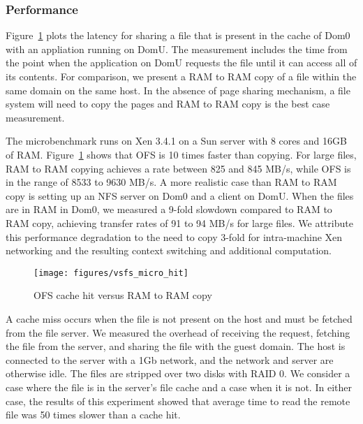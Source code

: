 \subsubsection{Performance}\label{sec:OFS_Perf}

Figure~\ref{fig:vsfs_hit} plots the latency for sharing a file that is
present in the cache of Dom0 with an appliation running on DomU. The
measurement includes the time from the point when the application on
DomU requests the file until it can access all of its contents.  For
comparison, we present a RAM to RAM copy of a file within the same
domain on the same host. In the absence of page sharing mechanism, a
file system will need to copy the pages and RAM to RAM copy is the
best case measurement.

The microbenchmark runs on Xen 3.4.1 on a Sun server with 8 cores and
16GB of RAM. Figure~\ref{fig:vsfs_hit} shows that OFS is 10 times
faster than copying. For large files, RAM to RAM copying achieves a
rate between 825 and 845 MB/s, while OFS is in the range of 8533 to
9630 MB/s. A more realistic case than RAM to RAM copy is setting up an
NFS server on Dom0 and a client on DomU. When the files are in RAM in
Dom0, we measured a 9-fold slowdown compared to RAM to RAM copy,
achieving transfer rates of 91 to 94 MB/s for large files. We
attribute this performance degradation to the need to copy 3-fold for
intra-machine Xen networking and the resulting context switching and
additional computation.

\begin{figure} [H]
\begin{centering}
\texttt{[image: figures/vsfs\_micro\_hit]}\caption{\label{fig:vsfs_hit}OFS cache hit versus RAM to RAM copy}
\par\end{centering}
\end{figure}

A cache miss occurs when the file is not present on the host and must
be fetched from the file server. We measured the overhead of receiving
the request, fetching the file from the server, and sharing the file
with the guest domain. The host is connected to the server with a 1Gb
network, and the network and server are otherwise idle. The files are
stripped over two disks with RAID 0. We consider a case where the file
is in the server's file cache and a case when it is not. In either
case, the results of this experiment showed that average time
to read the remote file was 50 times slower than a cache hit.

